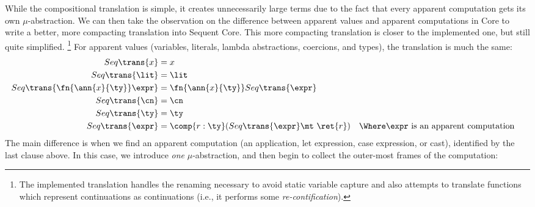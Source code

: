 \documentclass{article}
\begin{document}
While the compositional translation is simple, it creates unnecessarily large
terms due to the fact that every apparent computation gets its own
$\mu$-abstraction.  We can then take the observation on the difference between
apparent values and apparent computations in Core to write a better, more
compacting translation into Sequent Core.  This more compacting translation is
closer to the implemented one, but still quite simplified.%
\footnote{The implemented translation handles the renaming necessary to avoid
  static variable capture and also attempts to translate functions which
  represent continuations as continuations (i.e., it performs some
  \emph{re-contification}).}
For apparent values (variables, literals, lambda abstractions, coercions, and
types), the translation is much the same:
\begin{align*}
  Seq\trans{x} &= x
  \\
  Seq\trans{\lit} &= \lit
  \\
  Seq\trans{\fn{\ann{x}{\ty}} \expr}
  &=
  \fn{\ann{x}{\ty}} Seq\trans{\expr}
  \\
  Seq\trans{\cn} &= \cn
  \\
  Seq\trans{\ty} &= \ty
  \\
  Seq\trans{\expr}
  &= \comp{r:\ty} (Seq\trans{\expr} \mt ~ \ret{r})
  &
  \Where
  \expr & \text{ is an apparent computation}
\end{align*}
The main difference is when we find an apparent computation (an application, let
expression, case expression, or cast), identified by the last clause above.  In
this case, we introduce \emph{one} $\mu$-abstraction, and then begin to collect
the outer-most frames of the computation:
\end{document}
